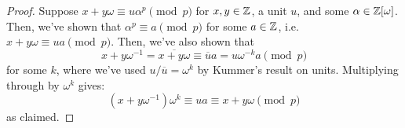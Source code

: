 \begin{proof}
    Suppose $x+y\omega \equiv u\alpha^p \pmod{p}$ for $x,y \in \mathbb{Z}$, a unit $u$, and some $\alpha \in \mathbb{Z}[\omega]$. Then, we've shown that $\alpha^p \equiv a \pmod{p}$ for some $a \in \mathbb{Z}$, i.e. $x+y\omega \equiv ua \pmod{p}$. Then, we've also shown that
    \[ x+y\omega^{-1} = \overline{x+y\omega} \equiv \overline{u}a = u\omega^{-k}a \pmod{p} \]
    for some $k$, where we've used $u/\overline{u} = \omega^k$ by Kummer's result on units. Multiplying through by $\omega^k$ gives:
    \[ (x+y\omega^{-1})\omega^k \equiv ua \equiv x+y\omega \pmod{p} \]
    as claimed.
\end{proof}
